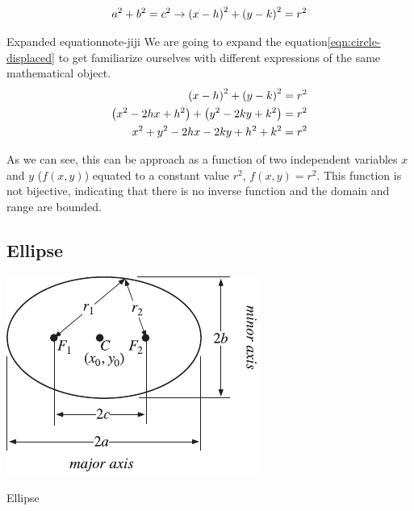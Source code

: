 \documentclass[../main-notes.tex]{subfile}
\begin{document}
\begin{gather*}
    a^2 + b^2 = c^2\to\qty(x-h)^2 + \qty(y-k)^2 = r^2
\end{gather*}

\begin{note}{Expanded equation}{note-jiji}
    We are going to expand the equation\eqref{eqn:circle-displaced} to get familiarize ourselves with different expressions of the same mathematical object.
    \begin{align*}
        \qty(x-h)^2 + \qty(y-k)^2 &= r^2 \\
        \qty(x^2 -2hx + h^2) + \qty(y^2 -2ky + k^2) &= r^2 \\
        x^2 + y^2 -2hx -2ky + h^2 + k^2 &= r^2
    \end{align*}

    As we can see, this can be approach as a function of two independent variables $x$ and $y$ ($f(x,y)$) equated to a constant value $r^2$, $f(x,y)=r^2$.
    This function is not bijective, indicating that there is no inverse function and the domain and range are bounded.

\end{note}


\subsection{Ellipse}

\begin{marginfigure}
    \centering
    \includegraphics[width=\textwidth]{../Figures/ellipse/EllipseBipolar_700.pdf}
    \caption{Ellipse}\label{fig-ellipse-recap}
\end{marginfigure}
\end{document}
